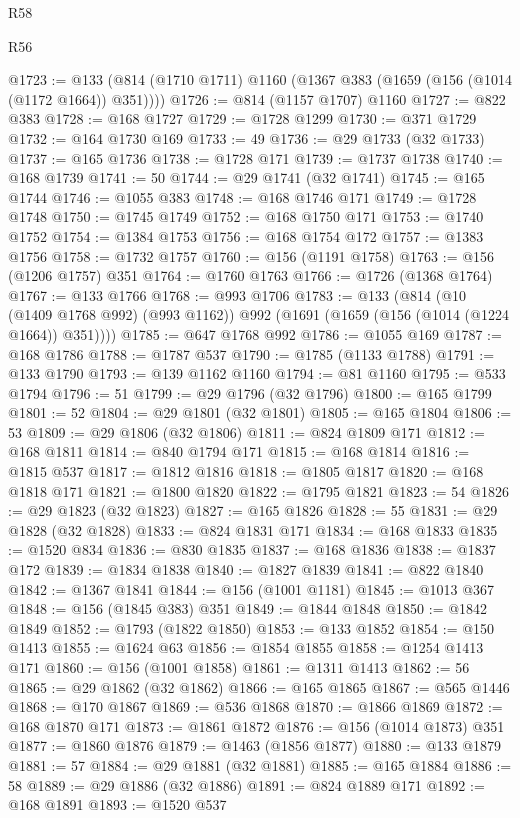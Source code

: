 \begin{lexlean}{R58}
\begin{lexlean}{R56}
\begin{coremodule}
{{{{{{{{{{{{{{{{{{{{{{{{{{{{{{{{{{{{{{{{{{{{{{{{{{{{{{{{{{{{{{{{{{{{{{{{{{{{{{{{{{{{{{{{{{{{{{{{{{{{{{{{{{{{{{{{{{{{{{{{{{{{{{{{{{{{{{{{{{{{{{{{{{{{{{{{{{{{{{{{{{{{{{{{{{{{{{{{{{{{{{{{{{{{{{{{{{{{{{{{{{{{{{{{{{{@1723 := @133 (@814 (@1710 @1711) @1160 (@1367 @383 (@1659 (@156 (@1014 (@1172 @1664)) @351))))
@1726 := @814 (@1157 @1707) @1160
@1727 := @822 @383
@1728 := @168 @1727
@1729 := @1728 @1299
@1730 := @371 @1729
@1732 := @164 @1730 @169
@1733 := 49
@1736 := @29 @1733 (@32 @1733)
@1737 := @165 @1736
@1738 := @1728 @171
@1739 := @1737 @1738
@1740 := @168 @1739
@1741 := 50
@1744 := @29 @1741 (@32 @1741)
@1745 := @165 @1744
@1746 := @1055 @383
@1748 := @168 @1746 @171
@1749 := @1728 @1748
@1750 := @1745 @1749
@1752 := @168 @1750 @171
@1753 := @1740 @1752
@1754 := @1384 @1753
@1756 := @168 @1754 @172
@1757 := @1383 @1756
@1758 := @1732 @1757
@1760 := @156 (@1191 @1758)
@1763 := @156 (@1206 @1757) @351
@1764 := @1760 @1763
@1766 := @1726 (@1368 @1764)
@1767 := @133 @1766
@1768 := @993 @1706
@1783 := @133
    (@814
      (@10 (@1409 @1768 @992) (@993 @1162))
      @992
      (@1691 (@1659 (@156 (@1014 (@1224 @1664)) @351))))
@1785 := @647 @1768 @992
@1786 := @1055 @169
@1787 := @168 @1786
@1788 := @1787 @537
@1790 := @1785 (@1133 @1788)
@1791 := @133 @1790
@1793 := @139 @1162 @1160
@1794 := @81 @1160
@1795 := @533 @1794
@1796 := 51
@1799 := @29 @1796 (@32 @1796)
@1800 := @165 @1799
@1801 := 52
@1804 := @29 @1801 (@32 @1801)
@1805 := @165 @1804
@1806 := 53
@1809 := @29 @1806 (@32 @1806)
@1811 := @824 @1809 @171
@1812 := @168 @1811
@1814 := @840 @1794 @171
@1815 := @168 @1814
@1816 := @1815 @537
@1817 := @1812 @1816
@1818 := @1805 @1817
@1820 := @168 @1818 @171
@1821 := @1800 @1820
@1822 := @1795 @1821
@1823 := 54
@1826 := @29 @1823 (@32 @1823)
@1827 := @165 @1826
@1828 := 55
@1831 := @29 @1828 (@32 @1828)
@1833 := @824 @1831 @171
@1834 := @168 @1833
@1835 := @1520 @834
@1836 := @830 @1835
@1837 := @168 @1836
@1838 := @1837 @172
@1839 := @1834 @1838
@1840 := @1827 @1839
@1841 := @822 @1840
@1842 := @1367 @1841
@1844 := @156 (@1001 @1181)
@1845 := @1013 @367
@1848 := @156 (@1845 @383) @351
@1849 := @1844 @1848
@1850 := @1842 @1849
@1852 := @1793 (@1822 @1850)
@1853 := @133 @1852
@1854 := @150 @1413
@1855 := @1624 @63
@1856 := @1854 @1855
@1858 := @1254 @1413 @171
@1860 := @156 (@1001 @1858)
@1861 := @1311 @1413
@1862 := 56
@1865 := @29 @1862 (@32 @1862)
@1866 := @165 @1865
@1867 := @565 @1446
@1868 := @170 @1867
@1869 := @536 @1868
@1870 := @1866 @1869
@1872 := @168 @1870 @171
@1873 := @1861 @1872
@1876 := @156 (@1014 @1873) @351
@1877 := @1860 @1876
@1879 := @1463 (@1856 @1877)
@1880 := @133 @1879
@1881 := 57
@1884 := @29 @1881 (@32 @1881)
@1885 := @165 @1884
@1886 := 58
@1889 := @29 @1886 (@32 @1886)
@1891 := @824 @1889 @171
@1892 := @168 @1891
@1893 := @1520 @537
}}}}}}}}}}}}}}}}}}}}}}}}}}}}}}}}}}}}}}}}}}}}}}}}}}}}}}}}}}}}}}}}}}}}}}}}}}}}}}}}}}}}}}}}}}}}}}}}}}}}}}}}}}}}}}}}}}}}}}}}}}}}}}}}}}}}}}}}}}}}}}}}}}}}}}}}}}}}}}}}}}}}}}}}}}}}}}}}}}}}}}}}}}}}}}}}}}}}}}}}}}}}}}}}}}}
\end{coremodule}
\end{lexlean}
\end{lexlean}
